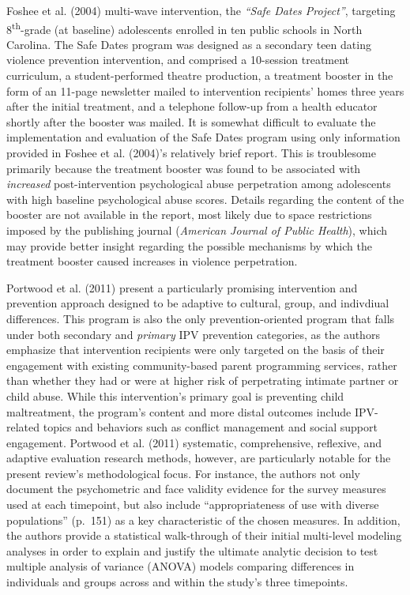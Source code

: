 \documentclass[11pt,]{tufte-book}
\begin{document}
Foshee et al. (2004) multi-wave intervention, the \emph{``Safe Dates
Project''}, targeting 8\textsuperscript{th}-grade (at baseline)
adolescents enrolled in ten public schools in North Carolina. The Safe
Dates program was designed as a secondary teen dating violence
prevention intervention, and comprised a 10-session treatment
curriculum, a student-performed theatre production, a treatment booster
in the form of an 11-page newsletter mailed to intervention recipients'
homes three years after the initial treatment, and a telephone follow-up
from a health educator shortly after the booster was mailed. It is
somewhat difficult to evaluate the implementation and evaluation of the
Safe Dates program using only information provided in Foshee et al.
(2004)'s relatively brief report. This is troublesome primarily because
the treatment booster was found to be associated with \emph{increased}
post-intervention psychological abuse perpetration among adolescents
with high baseline psychological abuse scores. Details regarding the
content of the booster are not available in the report, most likely due
to space restrictions imposed by the publishing journal (\emph{American
Journal of Public Health}), which may provide better insight regarding
the possible mechanisms by which the treatment booster caused increases
in violence perpetration.

Portwood et al. (2011) present a particularly promising intervention and
prevention approach designed to be adaptive to cultural, group, and
indivdiual differences. This program is also the only
prevention-oriented program that falls under both secondary and
\emph{primary} IPV prevention categories, as the authors emphasize that
intervention recipients were only targeted on the basis of their
engagement with existing community-based parent programming services,
rather than whether they had or were at higher risk of perpetrating
intimate partner or child abuse. While this intervention's primary goal
is preventing child maltreatment, the program's content and more distal
outcomes include IPV-related topics and behaviors such as conflict
management and social support engagement. Portwood et al. (2011)
systematic, comprehensive, reflexive, and adaptive evaluation research
methods, however, are particularly notable for the present review's
methodological focus. For instance, the authors not only document the
psychometric and face validity evidence for the survey measures used at
each timepoint, but also include ``appropriateness of use with diverse
populations'' (p.~151) as a key characteristic of the chosen measures.
In addition, the authors provide a statistical walk-through of their
initial multi-level modeling analyses in order to explain and justify
the ultimate analytic decision to test multiple analysis of variance
(ANOVA) models comparing differences in individuals and groups across
and within the study's three timepoints.
\end{document}
